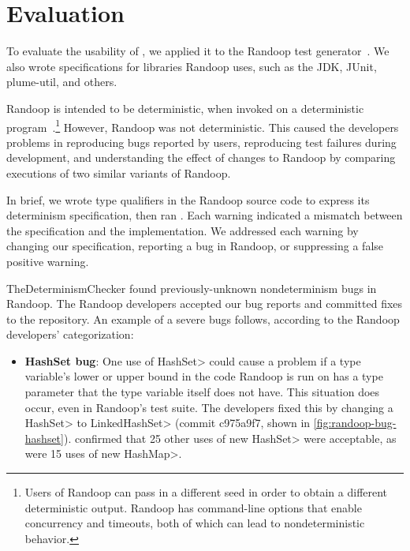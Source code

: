 \section{Evaluation\label{sec:results}}
To evaluate the usability of \theDeterminismChecker,
we applied it to the Randoop test
generator~\ifanonymous{}\else\cite{PachecoLEB2007}\fi.
We also wrote specifications for libraries Randoop uses, such as the JDK,
JUnit, plume-util, and others.

Randoop is intended to be deterministic, when invoked on a deterministic
program~\cite{randoop-manual}.\footnote{Users of Randoop can pass in a different seed in order to
    obtain a different deterministic output.  Randoop has command-line
    options that enable concurrency and timeouts, both of which can lead to
    nondeterministic behavior.}
However, Randoop was not deterministic.  This caused the developers
problems in 
reproducing bugs reported by users, 
reproducing test failures during development, and
understanding the effect of changes to Randoop by comparing executions of two
similar variants of Randoop.

In brief, we wrote type qualifiers in the Randoop source code to express its
determinism specification,
then ran
\theDeterminismChecker.  Each warning indicated a mismatch between the
specification and the implementation.  We addressed each warning by changing our
specification, reporting a bug in Randoop, or suppressing a false positive warning.

TheDeterminismChecker found \numRandoopBugs previously-unknown nondeterminism bugs in Randoop.
The Randoop developers accepted our bug reports and committed fixes to the repository. An example
of a severe bugs follows, according to the Randoop developers' categorization:

\begin{itemize}
    \item
    \textbf{HashSet bug}: One use of \<HashSet> could cause a problem if a type variable's lower or upper
    bound in the code Randoop is run on has a type parameter that the type variable itself does not have.
    This situation does occur, even in Randoop's test suite.
    The developers fixed this by changing a \<HashSet> to \<LinkedHashSet>
    (commit c975a9f7, shown in \cref{fig:randoop-bug-hashset}).
    \TheDeterminismChecker confirmed that 
    25 other uses of \<new HashSet> were acceptable, as were 15 uses of \<new HashMap>.
\end{itemize}

